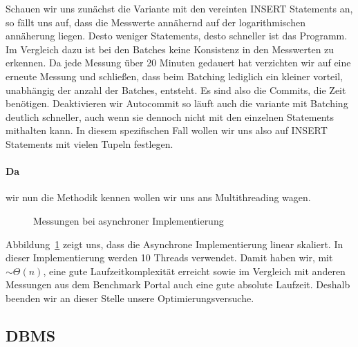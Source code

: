 Schauen wir uns zunächst die Variante mit den vereinten INSERT Statements an, so fällt uns auf, dass die Messwerte annähernd auf der logarithmischen annäherung liegen.
Desto weniger Statements, desto schneller ist das Programm.
Im Vergleich dazu ist bei den Batches keine Konsistenz in den Messwerten zu erkennen.
Da jede Messung über 20 Minuten gedauert hat verzichten wir auf eine erneute Messung und schließen, dass beim Batching lediglich ein kleiner vorteil, unabhängig der anzahl der Batches, entsteht.
Es sind also die Commits, die Zeit benötigen.
Deaktivieren wir Autocommit so läuft auch die variante mit Batching deutlich schneller, auch wenn sie dennoch nicht mit den einzelnen Statements mithalten kann.
In diesem spezifischen Fall wollen wir uns also auf INSERT Statements mit vielen Tupeln festlegen.


\paragraph{Da} wir nun die Methodik kennen wollen wir uns ans Multithreading wagen.
\begin{figure}[h!]
    \center
    \caption{Messungen bei asynchroner Implementierung}
    \label{fig:async-graph}
\end{figure}
Abbildung~\ref{fig:async-graph} zeigt uns, dass die Asynchrone Implementierung linear skaliert.
In dieser Implementierung werden 10 Threads verwendet.
Damit haben wir, mit $\sim\Theta(n)$, eine gute Laufzeitkomplexität erreicht sowie im Vergleich mit anderen Messungen aus dem Benchmark Portal auch eine gute absolute Laufzeit.
Deshalb beenden wir an dieser Stelle unsere Optimierungsversuche.


\subsection{DBMS}\label{subsec:dbms}
